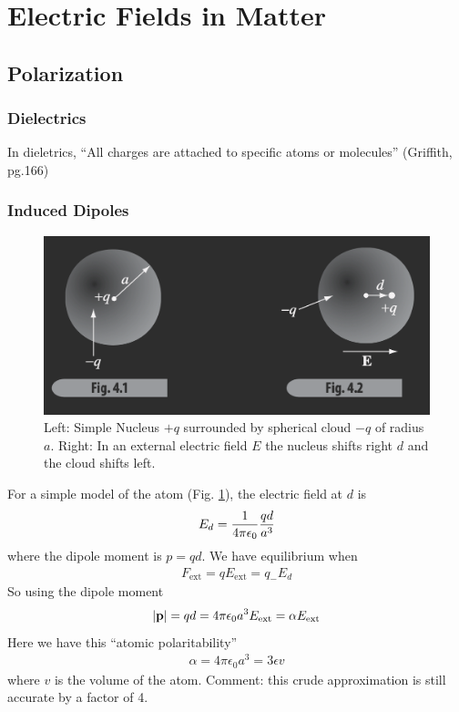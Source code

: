 \documentclass[../main.tex]{subfiles}
\begin{document}
\pagestyle{fancy}

\section{Electric Fields in Matter}
\barh \vspace{1em}

\subsection{Polarization} 

\subsubsection{Dielectrics}

In dieletrics, ``All charges are attached to specific atoms or molecules'' (Griffith, pg.166)

\subsubsection{Induced Dipoles}

\begin{figure}[ht]
    \centering
    \includegraphics[width=0.5\linewidth]{fig4_1_2.png}
    \caption{Left: Simple Nucleus $+q$ surrounded by spherical cloud $-q$ of radius $a$. Right: In an external electric field $E$ the nucleus shifts right $d$ and the cloud shifts left.}
    \label{fig:4_1_2}
\end{figure}

For a simple model of the atom (Fig. \ref{fig:4_1_2}), the electric field at $d$ is
\begin{align*}
    E_d = \frac{1}{4\pi\epsilon_0} \frac{qd}{a^3}
\end{align*}
where the dipole moment is $p = qd$. We have equilibrium when
\begin{align*}
    F_\text{ext} = q E_\text{ext} = q_- E_d
\end{align*}
So using the dipole moment 
\begin{align*}
    \abs{\vb p} = qd = 4\pi \epsilon_0 a^3 E_\text{ext} = \alpha E_\text{ext} 
\end{align*}
Here we have this ``atomic polaritability''
\begin{align*}
    \alpha = 4\pi \epsilon_0 a^3 = 3\epsilon v
\end{align*}
where $v$ is the volume of the atom. Comment: this crude approximation is still accurate by a factor of 4.
\end{document}
